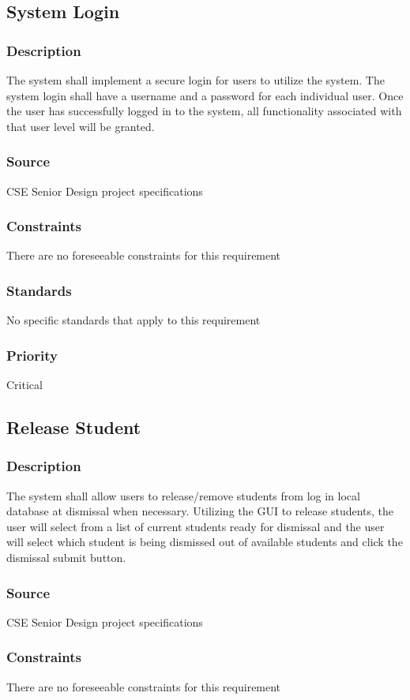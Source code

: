 
\subsection{System Login}
\subsubsection{Description}
The system shall implement a secure login for users to utilize the system. The 
system login shall have a username and a password for each individual user. Once the 
user has successfully logged in to the system, all functionality associated with 
that user level will be granted.
\subsubsection{Source}
CSE Senior Design project specifications
\subsubsection{Constraints}
There are no foreseeable constraints for this requirement  
\subsubsection{Standards}
No specific standards that apply to this requirement
\subsubsection{Priority}
Critical


\subsection{Release Student}
\subsubsection{Description}
The system shall allow users to release/remove students from log in local database 
at dismissal when necessary. Utilizing the GUI to release students, the user will 
select from a list of current students ready for dismissal and the user will select 
which student is being dismissed out of available students and click the dismissal 
submit button.  
\subsubsection{Source}
CSE Senior Design project specifications
\subsubsection{Constraints}
There are no foreseeable constraints for this requirement  
